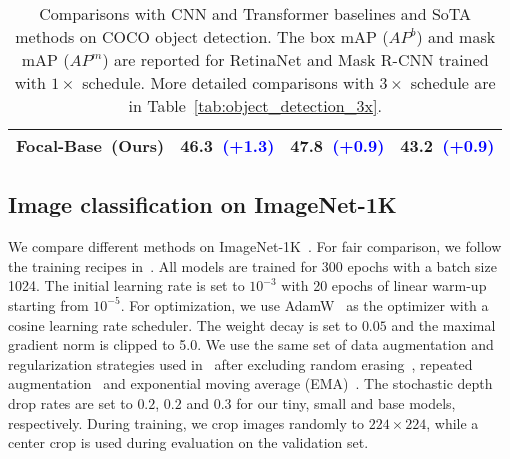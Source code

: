 \documentclass{article}
\begin{document}
\begin{table}[t!]
\begin{minipage}{0.52\linewidth}
{\begin{tabular}{l|l|ll}
    \rowcolor{Gray}
    Focal-Base~(Ours) & \textbf{46.3}~\scriptsize{\textcolor{blue}{\bf(+1.3)}} & \textbf{47.8}~\scriptsize{\textcolor{blue}{\bf(+0.9)}} & \textbf{43.2}~\scriptsize{\textcolor{blue}{\bf(+0.9)}} \\
    \bottomrule
    \end{tabular}}
    \vspace{3pt}
    \caption{Comparisons with CNN and Transformer baselines and SoTA methods on COCO object detection. The box mAP ($AP^b$) and mask mAP ($AP^m$) are reported for RetinaNet and Mask R-CNN trained with $1\times$ schedule. More detailed comparisons with $3\times$ schedule are in Table~\ref{tab:object_detection_3x}.}
    \label{tab:object_detection}
\end{minipage}
\end{table}







\subsection{Image classification on ImageNet-1K}

We compare different methods on ImageNet-1K~\cite{deng2009imagenet}. For fair comparison, we follow the training recipes in~\cite{touvron2020training,wang2021pyramid}. All models are trained for 300 epochs with a batch size 1024. The initial learning rate is set to $10^{-3}$ with 20 epochs of linear warm-up starting from $10^{-5}$. For optimization, we use AdamW~\cite{loshchilov2017decoupled} as the optimizer with a cosine learning rate scheduler. The weight decay is set to $0.05$ and the maximal gradient norm is clipped to 5.0. We use the same set of data augmentation and regularization strategies used in~\cite{touvron2020training} after excluding random erasing~\cite{zhong2020random}, repeated augmentation~\cite{berman2019multigrain,hoffer2020augment} and exponential moving average (EMA)~\cite{polyak1992acceleration}. 
The stochastic depth drop rates are set to $0.2$, $0.2$ and $0.3$ for our tiny, small and base models, respectively. During training, we crop images randomly to $224 \times 224$, while a center crop is used during evaluation on the validation set.
\end{document}
